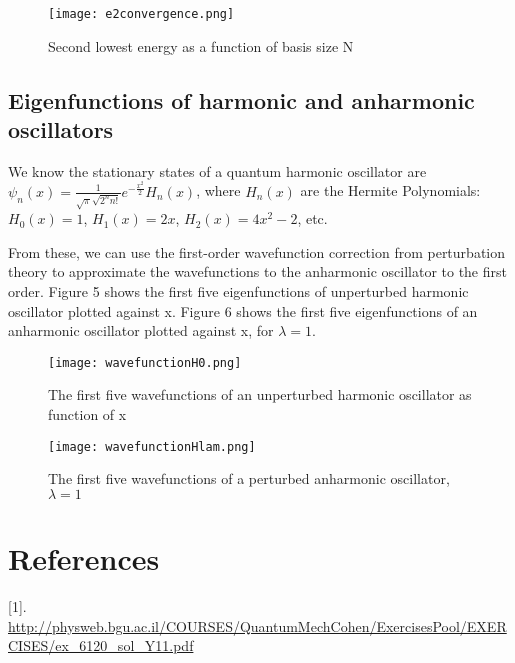 \documentclass[]{article}
\begin{document}
\begin{figure}[h!]
	\begin{center}   
		\texttt{[image: e2convergence.png]}
		\caption{Second lowest energy as a function of basis size N} 
	\end{center}  
\end{figure}

\subsection{Eigenfunctions of harmonic and anharmonic oscillators }
We know the stationary states of a quantum harmonic oscillator are $\psi_n (x)=\frac{1}{\sqrt{\pi}\sqrt{2^{n}n!}} e^{-\frac{x^2}{2}} H_{n}(x)$, where $H_{n}(x)$ are the Hermite Polynomials: $H_0(x)=1$, $H_1(x)=2x$, $H_2(x)=4x^2 -2$, etc.

From these, we can use the first-order wavefunction correction from perturbation theory to approximate the wavefunctions to the anharmonic oscillator to the first order.
Figure 5 shows the first five eigenfunctions of unperturbed harmonic oscillator plotted against x. Figure 6 shows the first five eigenfunctions of an anharmonic oscillator plotted against x, for $\lambda=1$.
\begin{figure}[h!]
	\begin{center}   
		\texttt{[image: wavefunctionH0.png]}
		\caption{The first five wavefunctions of an unperturbed harmonic oscillator as function of x} 
	\end{center}  
\end{figure}


\begin{figure}[h!]
	\begin{center}   
		\texttt{[image: wavefunctionHlam.png]}
		\caption{The first five wavefunctions of a perturbed anharmonic oscillator, $\lambda=1$} 
	\end{center}  
\end{figure}

\section{References}
[1]. \url{http://physweb.bgu.ac.il/COURSES/QuantumMechCohen/ExercisesPool/EXERCISES/ex_6120_sol_Y11.pdf}
\end{document}
